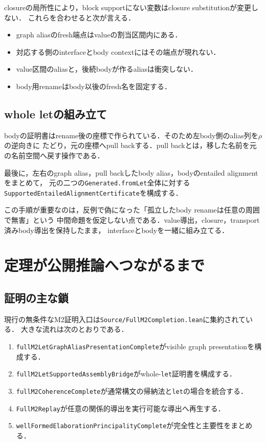 \documentclass[11pt,a4paper,oneside]{ltjsbook}
\newcommand{\code}[1]{\texttt{#1}}
\begin{document}
closureの局所性により，block supportにない変数はclosure substitutionが変更しない．
これらを合わせると次が言える．

\begin{itemize}[leftmargin=2em]
  \item graph aliasのfresh端点はvalueの割当区間内にある．
  \item 対応する側のinterfaceとbody contextにはその端点が現れない．
  \item value区間のaliasと，後続bodyが作るaliasは衝突しない．
  \item body用renameはbody以後のfresh名を固定する．
\end{itemize}

\section{whole letの組み立て}

bodyの証明書はrename後の座標で作られている．そのため左body側のalias列を$\rho$の逆向きに
たどり，元の座標へpull backする．pull backとは，移した名前を元の名前空間へ戻す操作である．

最後に，左右のgraph alias，pull backしたbody alias，bodyのentailed alignmentをまとめて，
元の二つの\code{Generated.fromLet}全体に対する
\code{SupportedEntailedAlignmentCertificate}を構成する．

この手順が重要なのは，反例で偽になった「孤立したbody renameは任意の周囲で無害」という
中間命題を仮定しない点である．value導出，closure，transport済みbody導出を保持したまま，
interfaceとbodyを一緒に組み立てる．

\chapter{定理が公開推論へつながるまで}

\section{証明の主な鎖}

現行の無条件なM2証明入口は\code{Source/FullM2Completion.lean}に集約されている．
大きな流れは次のとおりである．

\begin{enumerate}[leftmargin=2em]
  \item \code{fullM2LetGraphAliasPresentationComplete}がvisible graph presentationを構成する．
  \item \code{fullM2LetSupportedAssemblyBridge}がwhole-\code{let}証明書を構成する．
  \item \code{fullM2CoherenceComplete}が通常構文の帰納法と\code{let}の場合を統合する．
  \item \code{FullM2Replay}が任意の関係的導出を実行可能な導出へ再生する．
  \item \code{wellFormedElaborationPrincipalityComplete}が完全性と主要性をまとめる．
\end{enumerate}
\end{document}
